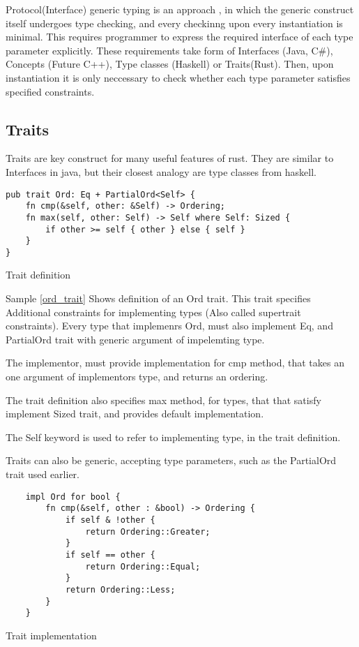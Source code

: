Protocol(Interface) generic typing is an approach , in which the generic construct itself undergoes type checking, and
every checkinng upon every instantiation is minimal. This requires programmer to express the required interface
of each type parameter explicitly. These requirements take form of Interfaces (Java, C\#), Concepts (Future C++),
Type classes (Haskell) or Traits(Rust). Then, upon instantiation it is only neccessary to check whether
each type parameter satisfies specified constraints.


\subsection{Traits}
Traits are key construct for many useful features of rust. They are similar to Interfaces in java, but
their closest analogy are type classes from haskell.


\begin{listing}[H]
\begin{verbatim}
pub trait Ord: Eq + PartialOrd<Self> {
    fn cmp(&self, other: &Self) -> Ordering;
    fn max(self, other: Self) -> Self where Self: Sized {
        if other >= self { other } else { self }
    }
}
\end{verbatim}
\label{ord_trait}
\caption{Trait definition}
\end{listing}

Sample \ref{ord_trait} Shows definition of an Ord trait. This trait specifies Additional constraints for implementing types
(Also called supertrait constraints). Every type that implemenrs Ord, must also implement Eq, and PartialOrd trait with generic
argument of impelemting type.

The implementor, must provide implementation for cmp method, that takes an one argument of implementors type,
and returns an ordering.

The trait definition also specifies max method, for types, that that satisfy implement Sized trait, and provides default
implementation.

The Self keyword is used to refer to implementing type, in the trait definition.

Traits can also be generic, accepting type parameters, such as the PartialOrd trait used earlier.

\begin{listing}[H]
\begin{verbatim}
    impl Ord for bool {
        fn cmp(&self, other : &bool) -> Ordering {
            if self & !other {
                return Ordering::Greater;
            }
            if self == other {
                return Ordering::Equal;
            }
            return Ordering::Less;
        }
    }
\end{verbatim}
\label{ord_impl}
\caption{Trait implementation}
\end{listing}

